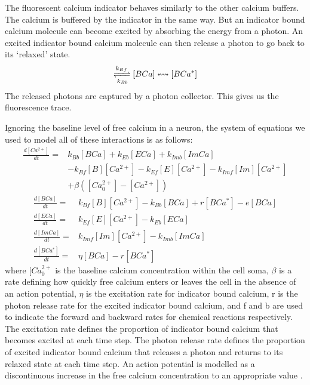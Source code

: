 \documentclass[a4paper,12pt]{article}
\theoremstyle{definition}
\newcommand{\diff}[2]{\frac{d #1}{d #2}}%
\begin{document}
The fluorescent calcium indicator behaves similarly to the other calcium buffers. The calcium is buffered by the indicator in the same way. But an indicator bound calcium molecule can become excited by absorbing the energy from a photon. An excited indicator bound calcium molecule can then release a photon to go back to its ‘relaxed’ state. 
\begin{align*}
    [B][Ca^{2+}] \xrightleftharpoons[k_{Bb}]{k_{Bf}} [BCa] \leftrightsquigarrow [BCa^{\ast}]
\end{align*}
The released photons are captured by a photon collector. This gives us the fluorescence trace.

Ignoring the baseline level of free calcium in a neuron, the system of equations we used to model all of these interactions is as follows:
\begin{equation} \label{eq:model_equations}
  \begin{split}
  \diff{[Ca^{2+}]}{t} = & k_{Bb}[BCa] + k_{Eb}[ECa] + k_{Imb}[ImCa] \\
                      & - k_{Bf}[B][Ca^{2+}]- k_{Ef} [E][Ca^{2+}] - k_{Imf}[Im][Ca^{2+}] \\
                      & + \beta ([Ca^{2+}_{0}] - [Ca^{2+}])
  \end{split}
\end{equation}
\begin{align}
  \diff{[BCa]}{t} = & k_{Bf}[B][Ca^{2+}] - k_{Bb}[BCa] + r[BCa^{*}] - e[BCa] \\
  \diff{[ECa]}{t} = & k_{Ef}[E][Ca^{2+}] - k_{Eb}[ECa] \\
  \diff{[ImCa]}{t} = & k_{Imf}[Im][Ca^{2+}] - k_{Imb}[ImCa] \\
  \diff{[BCa^{*}]}{t} = & \eta[BCa] - r[BCa^{*}]
\end{align}
where $[Ca^{2+}_{0}$ is the baseline calcium concentration within the cell soma, $\beta$ is a rate defining how quickly free calcium enters or leaves the cell in the absence of an action potential, $\eta$ is the excitation rate for indicator bound calcium, r is the photon release rate for the excited indicator bound calcium, and f and b are used to indicate the forward and backward rates for chemical reactions respectively. The excitation rate defines the proportion of indicator bound calcium that becomes excited at each time step. The photon release rate defines the proportion of excited indicator bound calcium that releases a photon and returns to its relaxed state at each time step. An action potential is modelled as a discontinuous increase in the free calcium concentration to an appropriate value \cite{maravall}.
\end{document}
